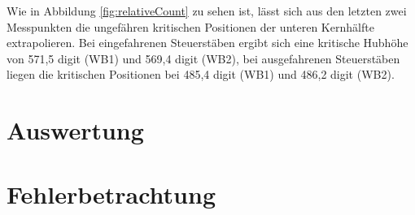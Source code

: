 \documentclass[12pt,german]{article}
\begin{document}
    Wie in Abbildung \ref{fig:relativeCount} zu sehen ist, lässt sich aus den letzten zwei Messpunkten die ungefähren kritischen Positionen der unteren Kernhälfte extrapolieren.
    Bei eingefahrenen Steuerstäben ergibt sich eine kritische Hubhöhe von 571,5 digit (WB1) und 569,4 digit (WB2), bei ausgefahrenen Steuerstäben liegen die kritischen Positionen bei 485,4 digit (WB1) und 486,2 digit (WB2).

    \section{Auswertung}


    \section{Fehlerbetrachtung}

\end{document}
